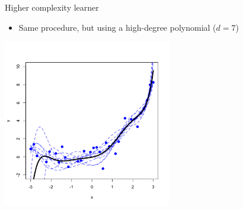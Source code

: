 \documentclass[11pt,compress,t,notes=noshow, xcolor=table]{beamer}
\begin{document}
\begin{vbframe}{Higher complexity learner}

\begin{itemize}
\item Same procedure, but using a high-degree polynomial ($d=7$)
\end{itemize}

\begin{center}
  \includegraphics[width = 0.55\textwidth]{figure/bias_variance_decomposition-complex_model.png}
\end{center}

\end{vbframe} 
\end{document}
